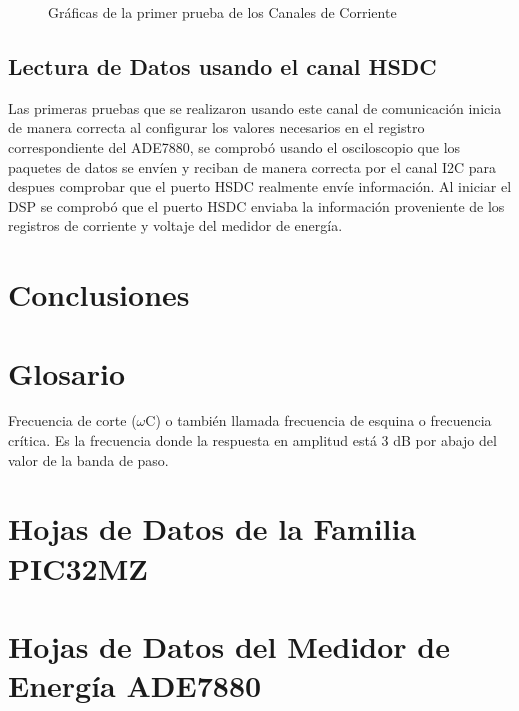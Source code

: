 \documentclass[letterpaper,12pt,oneside]{book}
\begin{document}
\begin{figure}[!htbp]
{			}
			\caption[Gráficas de la primer prueba de los Canales de Corriente]{Gráficas de la primer prueba de los Canales de Corriente}
			\label{CanalCorriente}
		\end{figure}

		\section{Lectura de Datos usando el canal HSDC}
		Las primeras pruebas que se realizaron usando este canal de comunicación inicia de manera correcta al configurar los valores necesarios en el registro correspondiente del ADE7880, se comprobó usando el osciloscopio que los paquetes de datos se envíen y reciban de manera correcta por el canal I2C para despues comprobar que el puerto HSDC realmente envíe información.
		Al iniciar el DSP se comprobó que el puerto HSDC enviaba la información proveniente de los registros de corriente y voltaje del medidor de energía.
	
	\chapter{Conclusiones}

	\chapter{Glosario}
	Frecuencia de corte ($\omega$C) o también llamada frecuencia de esquina o frecuencia crítica. Es  la  frecuencia  donde  la  respuesta  en  amplitud  está  3  dB  por  abajo  del  valor  de  la banda de paso.
	
	
	
	
	\appendix
	\chapter{Hojas de Datos de la Familia PIC32MZ}
		

	\chapter{Hojas de Datos del Medidor de Energía ADE7880}
		

	\backmatter%
\end{document}

